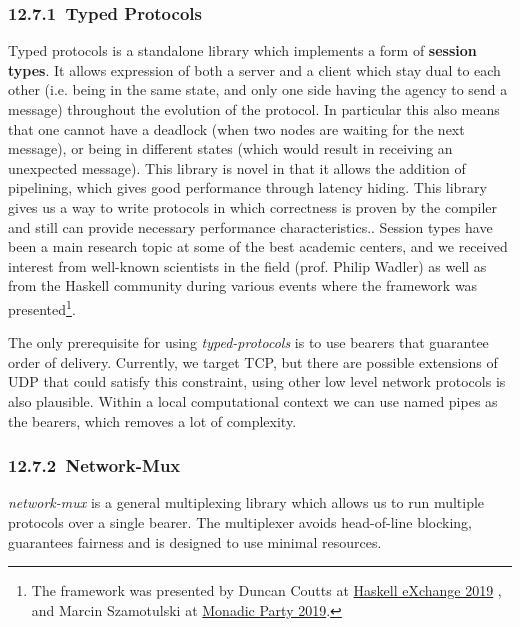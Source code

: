 \documentclass[11pt,a4paper]{article}
\begin{document}
\hypertarget{typed-protocols}{%
\subsubsection{​12.7.1​~Typed Protocols}\label{typed-protocols}}

Typed protocols is a standalone library which implements a form of
\textbf{session types}. It allows expression of both a server and a
client which stay dual to each other (i.e. being in the same state, and
only one side having the agency to send a message) throughout the
evolution of the protocol. In particular this also means that one cannot
have a deadlock (when two nodes are waiting for the next message), or
being in different states (which would result in receiving an unexpected
message). This library is novel in that it allows the addition of
pipelining, which gives good performance through latency hiding. This
library gives us a way to write protocols in which correctness is proven
by the compiler and still can provide necessary performance
characteristics.. Session types have been a main research topic at some
of the best academic centers, and we received interest from well-known
scientists in the field (prof. Philip Wadler) as well as from the
Haskell community during various events where the framework was
presented\footnote{The framework was presented by Duncan Coutts at
  \href{https://skillsmatter.com/skillscasts/14633-45-minute-talk-by-duncan-coutts}{{Haskell
  eXchange 2019}} , and Marcin Szamotulski at
  \href{https://www.youtube.com/watch?v=j8gza2L61nM}{{Monadic Party
  2019}}.}.

The only prerequisite for using \emph{typed-protocols} is to use bearers
that guarantee order of delivery. Currently, we target TCP, but there
are possible extensions of UDP that could satisfy this constraint, using
other low level network protocols is also plausible. Within a local
computational context we can use named pipes as the bearers, which
removes a lot of complexity.

\hypertarget{network-mux}{%
\subsubsection{​12.7.2​~Network-Mux}\label{network-mux}}

\emph{network-mux} is a general multiplexing library which allows us to
run multiple protocols over a single bearer. The multiplexer avoids
head-of-line blocking, guarantees fairness and is designed to use
minimal resources.
\end{document}
